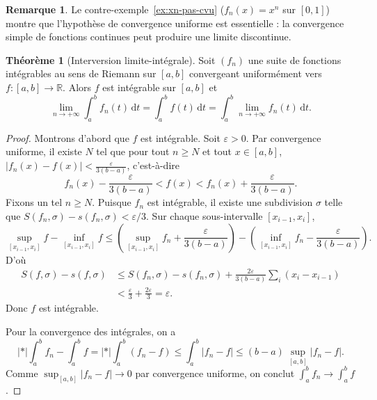 \documentclass[12pt,a4paper,openany]{book}
\theoremstyle{definition}
\newtheorem{theoreme}{Théorème}[chapter]
\newtheorem{remarque}{Remarque}[chapter]
\newcommand{\R}{\mathbb{R}}
\newcommand{\eps}{\varepsilon}
\newcommand{\abs}[1]{\left\lvert #1 \right\rvert}
\newcommand{\dd}{\mathrm{d}}
\begin{document}
\begin{remarque}\label{rem:contreexemple-cvs-continuite}
  Le contre-exemple~\ref{ex:xn-pas-cvu} ($f_n(x) = x^n$ sur $[0,1]$) montre que l'hypothèse de convergence uniforme est essentielle : la convergence simple de fonctions continues peut produire une limite discontinue.
\end{remarque}

\begin{theoreme}[Interversion limite-intégrale]\label{thm:interversion-limite-integrale}
  Soit $(f_n)$ une suite de fonctions intégrables au sens de Riemann sur $[a,b]$ convergeant uniformément vers $f \colon [a,b] \to \R$. Alors $f$ est intégrable sur $[a,b]$ et
  \[
    \lim_{n \to +\infty} \int_a^b f_n(t)\,\dd t = \int_a^b f(t)\,\dd t = \int_a^b \lim_{n \to +\infty} f_n(t)\,\dd t.
  \]
\end{theoreme}

\begin{proof}
  Montrons d'abord que $f$ est intégrable. Soit $\eps > 0$. Par convergence uniforme, il existe $N$ tel que pour tout $n \geqslant N$ et tout $x \in [a,b]$, $\abs{f_n(x) - f(x)} < \frac{\eps}{3(b-a)}$, c'est-à-dire
  \[
    f_n(x) - \frac{\eps}{3(b-a)} < f(x) < f_n(x) + \frac{\eps}{3(b-a)}.
  \]
  Fixons un tel $n \geqslant N$. Puisque $f_n$ est intégrable, il existe une subdivision $\sigma$ telle que $S(f_n,\sigma) - s(f_n,\sigma) < \eps/3$. Sur chaque sous-intervalle $[x_{i-1},x_i]$,
  \[
    \sup_{[x_{i-1},x_i]} f - \inf_{[x_{i-1},x_i]} f
    \leqslant \left(\sup_{[x_{i-1},x_i]} f_n + \frac{\eps}{3(b-a)}\right) - \left(\inf_{[x_{i-1},x_i]} f_n - \frac{\eps}{3(b-a)}\right).
  \]
  D'où
  \begin{align*}
    S(f,\sigma) - s(f,\sigma)
    &\leqslant S(f_n,\sigma) - s(f_n,\sigma) + \frac{2\eps}{3(b-a)}\sum_i (x_i - x_{i-1}) \\
    &< \frac{\eps}{3} + \frac{2\eps}{3} = \eps.
  \end{align*}
  Donc $f$ est intégrable.

  Pour la convergence des intégrales, on a
  \[
    \abs*{\int_a^b f_n - \int_a^b f}
    = \abs*{\int_a^b (f_n - f)}
    \leqslant \int_a^b \abs{f_n - f}
    \leqslant (b-a)\,\sup_{[a,b]}\abs{f_n - f}.
  \]
  Comme $\sup_{[a,b]}\abs{f_n - f} \to 0$ par convergence uniforme, on conclut $\int_a^b f_n \to \int_a^b f$.
\end{proof}
\end{document}
